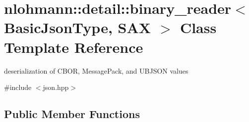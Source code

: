 \hypertarget{classnlohmann_1_1detail_1_1binary__reader}{}\section{nlohmann\+:\+:detail\+:\+:binary\+\_\+reader$<$ Basic\+Json\+Type, S\+AX $>$ Class Template Reference}
\label{classnlohmann_1_1detail_1_1binary__reader}


deserialization of C\+B\+OR, Message\+Pack, and U\+B\+J\+S\+ON values  




{\ttfamily \#include $<$json.\+hpp$>$}

\subsection*{Public Member Functions}
